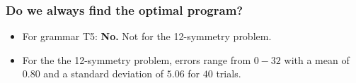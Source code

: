 \begin{frame}
\frametitle{
Do we always find the optimal program?
}
\begin{itemize}
\item For grammar T5: {\bf No.} Not for the 12-symmetry problem.
\item For the the 12-symmetry problem, errors range from $0-32$ 
       with a mean of $0.80$ and a standard deviation
       of $5.06$ for $40$ trials.
\end{itemize}
\end{frame}